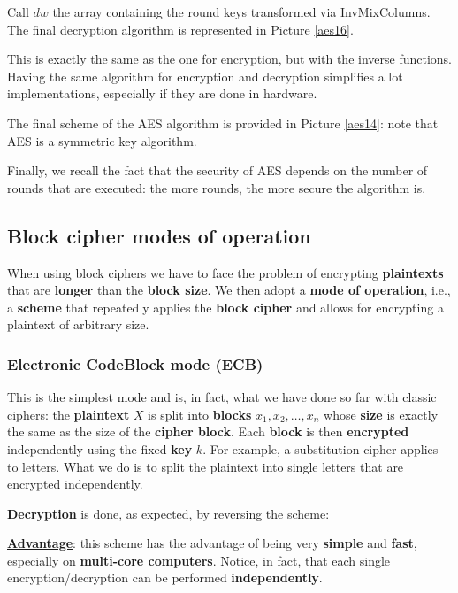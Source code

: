 Call $dw$ the array containing the round keys transformed via InvMixColumns. The final decryption algorithm is represented in Picture \ref{aes16}.


This is exactly the same as the one for encryption, but with the inverse functions. Having the same algorithm for encryption and decryption simplifies a lot implementations, especially if they are done in hardware.

The final scheme of the AES algorithm is provided in Picture \ref{aes14}: note that AES is a symmetric key algorithm.


Finally, we recall the fact that the security of AES depends on the number of rounds that are executed: the more rounds, the more secure the algorithm is.

\subsection{Block cipher modes of operation}
When using block ciphers we have to face the problem of encrypting \textbf{plaintexts} that are \textbf{longer} than the \textbf{block size}. We then adopt a \textbf{mode of operation}, i.e., a \textbf{scheme} that repeatedly applies the \textbf{block cipher} and allows for encrypting a plaintext of arbitrary size.

\subsubsection{Electronic CodeBlock mode (ECB)}
This is the simplest mode and is, in fact, what we have done so far with classic ciphers: the \textbf{plaintext} $X$ is split into \textbf{blocks} $x_1,x_2,\ldots,x_n$ whose \textbf{size} is exactly the same as the size of the \textbf{cipher block}. Each \textbf{block} is then \textbf{encrypted} independently using the fixed \textbf{key} $k$. For example, a substitution cipher applies to letters. What we do is to split the plaintext into single letters that are encrypted independently.


\textbf{Decryption} is done, as expected, by reversing the scheme:


\underline{\textbf{Advantage}}: this scheme has the advantage of being very \textbf{simple} and \textbf{fast}, especially on \textbf{multi-core computers}. Notice, in fact, that each single encryption/decryption can be performed \textbf{independently}.

